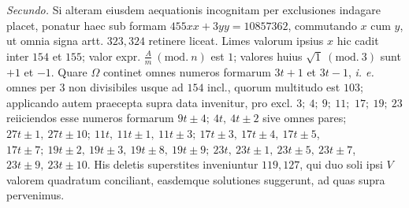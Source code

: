 \textit{Secundo.} Si alteram eiusdem aequationis incognitam per exclusiones indagare placet, ponatur haec sub formam \(455xx+3yy=10857362\), commutando \(x\) cum \(y\), ut omnia signa artt. \(323,\allowbreak 324\) retinere liceat. Limes valorum ipsius \(x\) hic cadit inter \(154\) et \(155\); valor expr. \(\frac Am\ (\mathrm{mod.}\ n)\) est \(1\); valores huius \(\surd1\ (\mathrm{mod.}\ 3)\) sunt \(+1\) et \(-1\). Quare \(\Omega\) continet omnes numeros formarum \(3t+1\) et \(3t-1\), \textit{i. e.} omnes per \(3\) non divisibiles usque ad \(154\) incl., quorum multitudo est \(103\); applicando autem praecepta supra data invenitur, pro excl. \(3;\allowbreak \ 4;\allowbreak \ 9;\allowbreak \ 11;\allowbreak \) \(17;\allowbreak \ 19;\allowbreak \ 23\) reiiciendos esse numeros formarum \(9t\pm4;\allowbreak \ 4t,\allowbreak \ 4t\pm2\) sive omnes pares; \(27t\pm1,\allowbreak \ 27t\pm10;\allowbreak \ 11t,\allowbreak \ 11t\pm1,\allowbreak \ 11t\pm3;\allowbreak \ 17t\pm3,\allowbreak \ 17t\pm4,\allowbreak \ 17t\pm5\), \(17t\pm7;\allowbreak \ 19t\pm2,\allowbreak \ 19t\pm3,\allowbreak \ 19t\pm8,\allowbreak \ 19t\pm9;\allowbreak \ 23t,\allowbreak \ 23t\pm1,\allowbreak \ 23t\pm5,\allowbreak \ 23t\pm7\), \(23t\pm9,\allowbreak \ 23t\pm10\). His deletis superstites inveniuntur \(119,\allowbreak 127\), qui duo soli ipsi \(V\) valorem quadratum conciliant, easdemque solutiones suggerunt, ad quas supra pervenimus.

